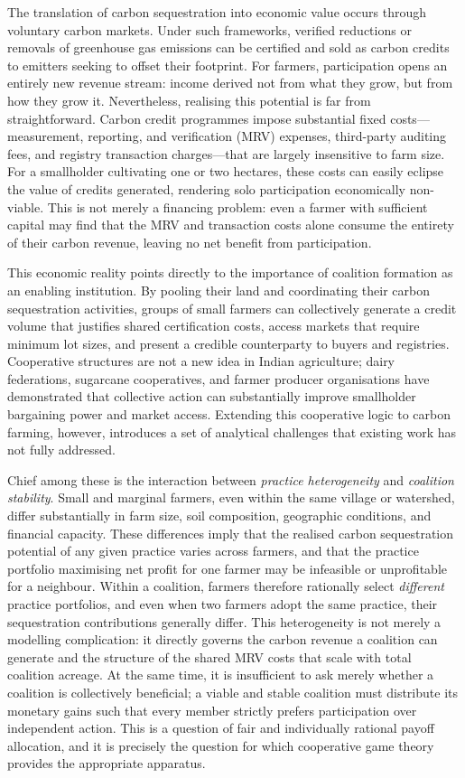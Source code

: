 \documentclass[manuscript, screen, review, anonymous]{acmart}
\begin{document}
The translation of carbon sequestration into economic value occurs through voluntary carbon markets. Under such frameworks, verified reductions or removals of greenhouse gas emissions can be certified and sold as carbon credits to emitters seeking to offset their footprint. For farmers, participation opens an entirely new revenue stream: income derived not from what they grow, but from how they grow it. Nevertheless, realising this potential is far from straightforward. Carbon credit programmes impose substantial fixed costs---measurement, reporting, and verification (MRV) expenses, third-party auditing fees, and registry transaction charges---that are largely insensitive to farm size. For a smallholder cultivating one or two hectares, these costs can easily eclipse the value of credits generated, rendering solo participation economically non-viable. This is not merely a financing problem: even a farmer with sufficient capital may find that the MRV and transaction costs alone consume the entirety of their carbon revenue, leaving no net benefit from participation.

This economic reality points directly to the importance of coalition formation as an enabling institution. By pooling their land and coordinating their carbon sequestration activities, groups of small farmers can collectively generate a credit volume that justifies shared certification costs, access markets that require minimum lot sizes, and present a credible counterparty to buyers and registries. Cooperative structures are not a new idea in Indian agriculture; dairy federations, sugarcane cooperatives, and farmer producer organisations have demonstrated that collective action can substantially improve smallholder bargaining power and market access. Extending this cooperative logic to carbon farming, however, introduces a set of analytical challenges that existing work has not fully addressed.

Chief among these is the interaction between \emph{practice heterogeneity} and \emph{coalition stability}. Small and marginal farmers, even within the same village or watershed, differ substantially in farm size, soil composition, geographic conditions, and financial capacity. These differences imply that the realised carbon sequestration potential of any given practice varies across farmers, and that the practice portfolio maximising net profit for one farmer may be infeasible or unprofitable for a neighbour. Within a coalition, farmers therefore rationally select \emph{different} practice portfolios, and even when two farmers adopt the same practice, their sequestration contributions generally differ. This heterogeneity is not merely a modelling complication: it directly governs the carbon revenue a coalition can generate and the structure of the shared MRV costs that scale with total coalition acreage. At the same time, it is insufficient to ask merely whether a coalition is collectively beneficial; a viable and stable coalition must distribute its monetary gains such that every member strictly prefers participation over independent action. This is a question of fair and individually rational payoff allocation, and it is precisely the question for which cooperative game theory provides the appropriate apparatus.
\end{document}

